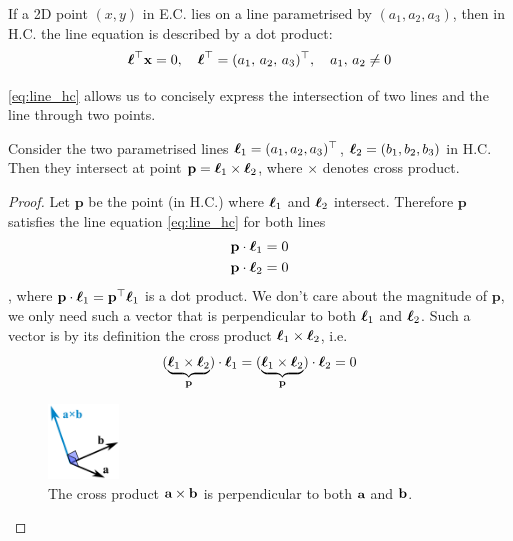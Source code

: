 \documentclass[a4paper]{article}
\begin{document}
\begin{corollary}
If a 2D point  $(x,y)$ in E.C.  lies on a line parametrised by $(a_1,a_2,a_3)$, then in H.C. the line equation is described by a dot product:
\begin{equation}
    \boldsymbol{\ell}^{\top} \textbf{\textup{x}}  = 0, \quad \boldsymbol{\ell}^{\top} = (a_1,\, a_2,\, a_3)^{\top}, \quad a_1,\, a_2 \neq 0
    \label{eq:line_hc}
\end{equation}
\end{corollary}
\eqref{eq:line_hc} allows us to concisely express the intersection of two lines and the line through two points.
\begin{corollary}
Consider the two parametrised lines $\boldsymbol{\ell}_1 = (a_1,a_2,a_3)^{\top}$, $\boldsymbol{\ell}_2 = (b_1,b_2,b_3)$ in H.C. Then they intersect at point $\textbf{p} = \boldsymbol{\ell}_1 \times \boldsymbol{\ell}_2$, where $\times$ denotes cross product.
\label{cor:inters_lines_hc}
\end{corollary}
\begin{proof}
Let $\textbf{p}$ be the point (in H.C.) where $\boldsymbol{\ell}_1$ and $\boldsymbol{\ell}_2$ intersect. Therefore $\textbf{p}$ satisfies the line equation \eqref{eq:line_hc} for both lines
\begin{align*}
    \textbf{p} \cdot \boldsymbol{\ell}_1 = 0\\
    \textbf{p} \cdot \boldsymbol{\ell}_2 = 0
\end{align*}
, where $\textbf{p} \cdot \boldsymbol{\ell}_1 =\textbf{p} ^{\top} \boldsymbol{\ell}_1$ is a dot product. We don't care about the magnitude of $\textbf{p}$, we only need such a vector that is perpendicular to both $\boldsymbol{\ell}_1$ and $\boldsymbol{\ell}_2$. Such a vector is by its definition the cross product $\boldsymbol{\ell}_1\times \boldsymbol{\ell}_2$, i.e.
\[
(\underbrace{\boldsymbol{\ell}_1\times \boldsymbol{\ell}_2}_{\textbf{p}})\cdot \boldsymbol{\ell}_1 = (\underbrace{\boldsymbol{\ell}_1\times \boldsymbol{\ell}_2}_{\textbf{p}})\cdot \boldsymbol{\ell}_2 = 0
\]
\begin{figure}[H]
    \centering
    \includegraphics[height=2cm]{img/cross_product_vis.png}
    \caption{The cross product $\textbf{a}\times \textbf{b}$ is perpendicular to both $\textbf{a}$ and $\textbf{b}$.}
    \label{fig:my_label}
\end{figure}
\end{proof}
\end{document}
